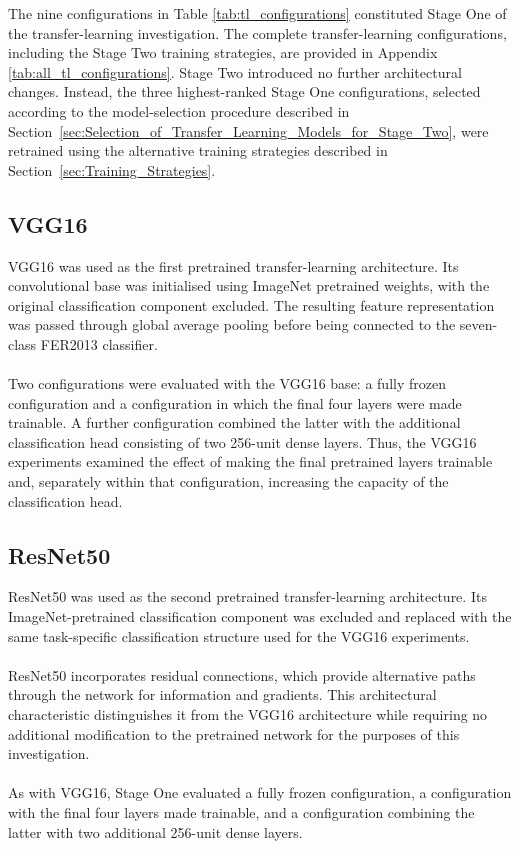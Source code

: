 \documentclass[12pt, a4paper]{report}
\let\oldsubsection\subsection
\renewcommand{\subsection}{%
    \Needspace{6\baselineskip}%
    \oldsubsection
}
\begin{document}
				The nine configurations in Table \ref{tab:tl_configurations} constituted Stage One of the transfer-learning investigation. The complete transfer-learning configurations, including the Stage Two training strategies, are provided in Appendix \ref{tab:all_tl_configurations}. Stage Two introduced no further architectural changes. Instead, the three highest-ranked Stage One configurations, selected according to the model-selection procedure described in Section~\ref{sec:Selection_of_Transfer_Learning_Models_for_Stage_Two}, were retrained using the alternative training strategies described in Section~\ref{sec:Training_Strategies}.
				
			\newpage
			\subsection{VGG16}
				
				VGG16 was used as the first pretrained transfer-learning architecture. Its convolutional base was initialised using ImageNet pretrained weights, with the original classification component excluded. The resulting feature representation was passed through global average pooling before being connected to the seven-class FER2013 classifier.\\\\
				Two configurations were evaluated with the VGG16 base: a fully frozen configuration and a configuration in which the final four layers were made trainable. A further configuration combined the latter with the additional classification head consisting of two 256-unit dense layers. Thus, the VGG16 experiments examined the effect of making the final pretrained layers trainable and, separately within that configuration, increasing the capacity of the classification head.
				
			\subsection{ResNet50}
				
				ResNet50 was used as the second pretrained transfer-learning architecture. Its ImageNet-pretrained classification component was excluded and replaced with the same task-specific classification structure used for the VGG16 experiments.\\\\
				ResNet50 incorporates residual connections, which provide alternative paths through the network for information and gradients. This architectural characteristic distinguishes it from the VGG16 architecture while requiring no additional modification to the pretrained network for the purposes of this investigation.\\\\
				As with VGG16, Stage One evaluated a fully frozen configuration, a configuration with the final four layers made trainable, and a configuration combining the latter with two additional 256-unit dense layers.
				
\end{document}

